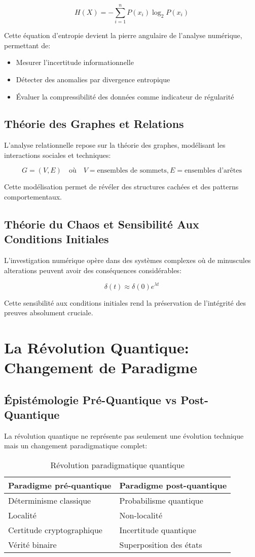 \[
H(X) = -\sum_{i=1}^{n} P(x_i) \log_2 P(x_i)
\]

Cette équation d'entropie devient la pierre angulaire de l'analyse numérique, permettant de:
\begin{itemize}
\item Mesurer l'incertitude informationnelle
\item Détecter des anomalies par divergence entropique
\item Évaluer la compressibilité des données comme indicateur de régularité
\end{itemize}

\subsection{Théorie des Graphes et Relations}
L'analyse relationnelle repose sur la théorie des graphes, modélisant les interactions sociales et techniques:

\[
G = (V, E) \quad \text{où} \quad V = \text{ensembles de sommets}, E = \text{ensembles d'arêtes}
\]

Cette modélisation permet de révéler des structures cachées et des patterns comportementaux.

\subsection{Théorie du Chaos et Sensibilité Aux Conditions Initiales}
L'investigation numérique opère dans des systèmes complexes où de minuscules alterations peuvent avoir des conséquences considérables:

\[
\delta(t) \approx \delta(0) e^{\lambda t}
\]

Cette sensibilité aux conditions initiales rend la préservation de l'intégrité des preuves absolument cruciale.

\section{La Révolution Quantique: Changement de Paradigme}
\subsection{Épistémologie Pré-Quantique vs Post-Quantique}
La révolution quantique ne représente pas seulement une évolution technique mais un changement paradigmatique complet:

\begin{table}[H]
\centering
\begin{tabular}{p{6cm}p{6cm}}
\hline
\textbf{Paradigme pré-quantique} & \textbf{Paradigme post-quantique} \\
\hline
Déterminisme classique & Probabilisme quantique \\
Localité & Non-localité \\
Certitude cryptographique & Incertitude quantique \\
Vérité binaire & Superposition des états \\
\hline
\end{tabular}
\caption{Révolution paradigmatique quantique}
\end{table}

